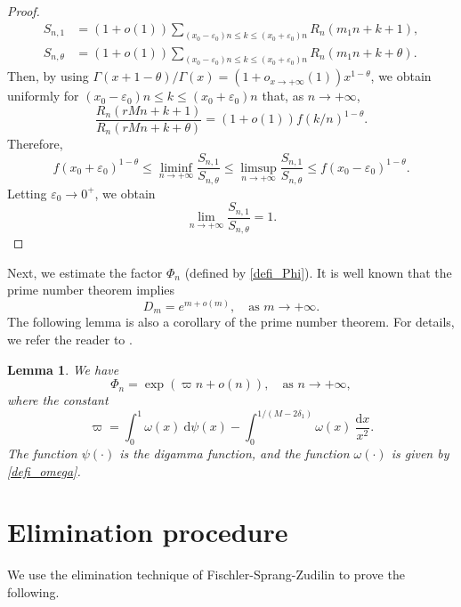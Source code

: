 \documentclass[12pt]{article}
\newtheorem{lemma}[theorem]{Lemma}
\numberwithin{equation}{section}
\begin{document}
\begin{proof}
\begin{align*}
S_{n, 1}&=(1+o(1)) \sum_{\left(x_0-\varepsilon_0\right) n \leqslant k \leqslant\left(x_0+\varepsilon_0\right) n} R_n\left(m_1 n+k+1\right), \\
S_{n, \theta}&=(1+o(1)) \sum_{\left(x_0-\varepsilon_0\right) n \leqslant k \leqslant\left(x_0+\varepsilon_0\right) n} R_n\left(m_1 n+k+\theta\right).
\end{align*}
Then, by using $\Gamma(x+1-\theta)/\Gamma(x) = (1+o_{x \to +\infty}(1)) x^{1-\theta}$, we obtain uniformly for $\left(x_0-\varepsilon_0\right) n \leqslant k \leqslant\left(x_0+\varepsilon_0\right) n$ that, as $n \to +\infty$,
\[ \frac{R_n\left( rMn+k+1\right)}{R_n\left( rMn+k+\theta\right)}=(1+o(1)) f(k/n)^{1-\theta}. \]
Therefore,
\[ f\left(x_0+\varepsilon_0\right)^{1-\theta} \leqslant \liminf _{n \rightarrow+\infty} \frac{S_{n, 1}}{S_{n, \theta}} \leqslant \limsup _{n \rightarrow+\infty} \frac{S_{n, 1}}{S_{n, \theta}} \leqslant f\left(x_0-\varepsilon_0\right)^{1-\theta}. \]
Letting $\varepsilon_0 \to 0^{+}$, we obtain
\[ \lim_{n \to +\infty} \frac{S_{n,1}}{S_{n,\theta}}  = 1.  \]
\end{proof}


Next, we estimate the factor $\Phi_n$ (defined by \eqref{defi_Phi}). It is well known that the prime number theorem implies 
\begin{equation}\label{PNT}
	D_m =e^{m+o(m)}, \quad \text{as~} m \to +\infty. 
\end{equation}
The following lemma is also a corollary of the prime number theorem. For details, we refer the reader to \cite[Lem. 4.4]{Zud2002}.
\begin{lemma}\label{est_Phi_n}
We have
	\[ \Phi_n = \exp\left( \varpi n + o(n) \right), \quad \text{as~} n \to +\infty,  \]
where the constant 
\begin{equation}\label{defi_varpi}
	\varpi = \int_{0}^{1} \omega(x)~\mathrm{d}\psi(x) - \int_{0}^{1/(M-2\delta_1)} \omega(x)~\frac{\mathrm{d}x}{x^2}.  
\end{equation}
The function $\psi(\cdot)$ is the digamma function, and the function $\omega(\cdot)$ is given by \eqref{defi_omega}.
\end{lemma} 




\section{Elimination procedure}\label{sec_5}

We use the elimination technique of Fischler-Sprang-Zudilin \cite{FSZ2019} to prove the following. 
\end{document}
